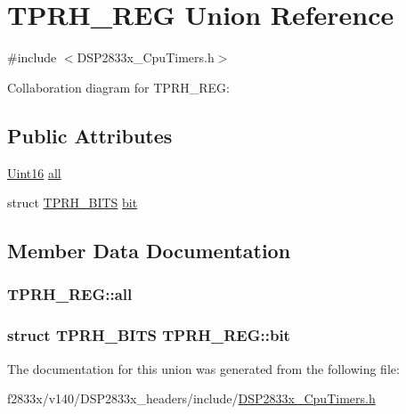 \hypertarget{union_t_p_r_h___r_e_g}{}\section{T\+P\+R\+H\+\_\+\+R\+E\+G Union Reference}
\label{union_t_p_r_h___r_e_g}


{\ttfamily \#include $<$D\+S\+P2833x\+\_\+\+Cpu\+Timers.\+h$>$}



Collaboration diagram for T\+P\+R\+H\+\_\+\+R\+E\+G\+:
\subsection*{Public Attributes}
\begin{DoxyCompactItemize}
\item 
\hyperlink{_d_s_p2833x___device_8h_a59a9f6be4562c327cbfb4f7e8e18f08b}{Uint16} \hyperlink{union_t_p_r_h___r_e_g_aef2be945d3314b15512a79cf00dccb10}{all}
\item 
struct \hyperlink{struct_t_p_r_h___b_i_t_s}{T\+P\+R\+H\+\_\+\+B\+I\+T\+S} \hyperlink{union_t_p_r_h___r_e_g_acba25b56578b3c1928b60bccb12f5c03}{bit}
\end{DoxyCompactItemize}


\subsection{Member Data Documentation}
\hypertarget{union_t_p_r_h___r_e_g_aef2be945d3314b15512a79cf00dccb10}{}
\subsubsection[{all}]{ T\+P\+R\+H\+\_\+\+R\+E\+G\+::all}\label{union_t_p_r_h___r_e_g_aef2be945d3314b15512a79cf00dccb10}
\hypertarget{union_t_p_r_h___r_e_g_acba25b56578b3c1928b60bccb12f5c03}{}
\subsubsection[{bit}]{\setlength{\rightskip}{0pt plus 5cm}struct {\bf T\+P\+R\+H\+\_\+\+B\+I\+T\+S} T\+P\+R\+H\+\_\+\+R\+E\+G\+::bit}\label{union_t_p_r_h___r_e_g_acba25b56578b3c1928b60bccb12f5c03}


The documentation for this union was generated from the following file\+:\begin{DoxyCompactItemize}
\item 
f2833x/v140/\+D\+S\+P2833x\+\_\+headers/include/\hyperlink{_d_s_p2833x___cpu_timers_8h}{D\+S\+P2833x\+\_\+\+Cpu\+Timers.\+h}\end{DoxyCompactItemize}
